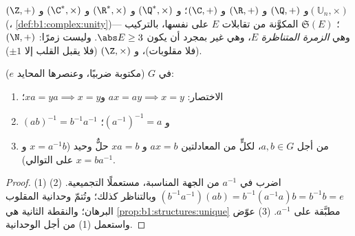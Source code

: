 \begin{example}\label{ex:b1:structures:groups}
$(\Z, +)$ و $(\Q, +)$ و $(\R, +)$ و $(\C, +)$؛ و $(\Q^*, \times)$
و $(\R^*, \times)$ و $(\C^*, \times)$ و$(\mathbb{U}_n, \times)$ (، \cref{def:b1:complex:unity})؛  $\mathfrak{S}(E)$ المكوَّنة من
تقابلات  $E$ على نفسها، بالتركيب --- وهي
\emph{الزمرة المتناظرة}  $E$، وهي غير  بمجرد
أن يكون $\abs E \geq 3$. وليست زمرًا: $(\N, +)$ (فلا مقلوبات)،
و $(\Z, \times)$ (فلا يقبل القلب إلا $\pm 1$).
\end{example}

\begin{proposition}\label{prop:b1:structures:rules}
في  $G$ (مكتوبة ضربيًا، وعنصرها المحايد $e$):
\begin{enumerate}
  \item الاختصار: $ax = ay \implies x = y$ و$xa = ya \implies
        x = y$؛
  \item $(ab)^{-1} = b^{-1} a^{-1}$ و $(a^{-1})^{-1} = a$؛
  \item من أجل $a, b \in G$، لكلٍّ من المعادلتين $ax = b$ و $xa = b$
        حلٌّ وحيد ($x = a^{-1}b$ و $x = b a^{-1}$ على التوالي).
\end{enumerate}
\end{proposition}

\begin{proof}
(1) اضرب في $a^{-1}$ من الجهة المناسبة، مستعملًا
التجميعية. (2) $(b^{-1}a^{-1})(ab) = b^{-1}(a^{-1}a)b = b^{-1}b =
e$ وبالتناظر كذلك؛ وتُتمّ وحدانية المقلوب البرهان؛ والنقطة
الثانية هي \cref{prop:b1:structures:unique} مطبَّقة على $a^{-1}$. (3)
عوّض واستعمل (1) من أجل الوحدانية.
\end{proof}

